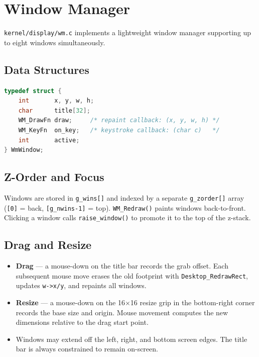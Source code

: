 \documentclass[11pt,a4paper]{report}
\begin{document}
\section{Window Manager}

\texttt{kernel/display/wm.c} implements a lightweight window manager supporting
up to eight windows simultaneously.

\subsection{Data Structures}

\begin{lstlisting}[language=C, caption={WmWindow structure}]
typedef struct {
    int       x, y, w, h;
    char      title[32];
    WM_DrawFn draw;     /* repaint callback: (x, y, w, h) */
    WM_KeyFn  on_key;   /* keystroke callback: (char c)   */
    int       active;
} WmWindow;
\end{lstlisting}

\subsection{Z-Order and Focus}

Windows are stored in \texttt{g\_wins[]} and indexed by a separate
\texttt{g\_zorder[]} array (\texttt{[0]} = back, \texttt{[g\_nwins-1]} = top).
\texttt{WM\_Redraw()} paints windows back-to-front.  Clicking a window calls
\texttt{raise\_window()} to promote it to the top of the z-stack.

\subsection{Drag and Resize}

\begin{itemize}
    \item \textbf{Drag} --- a mouse-down on the title bar records the grab offset.
          Each subsequent mouse move erases the old footprint with
          \texttt{Desktop\_RedrawRect}, updates \texttt{w->x/y}, and repaints
          all windows.
    \item \textbf{Resize} --- a mouse-down on the 16$\times$16 resize grip in the
          bottom-right corner records the base size and origin.  Mouse movement
          computes the new dimensions relative to the drag start point.
    \item Windows may extend off the left, right, and bottom screen edges.
          The title bar is always constrained to remain on-screen.
\end{itemize}
\end{document}
